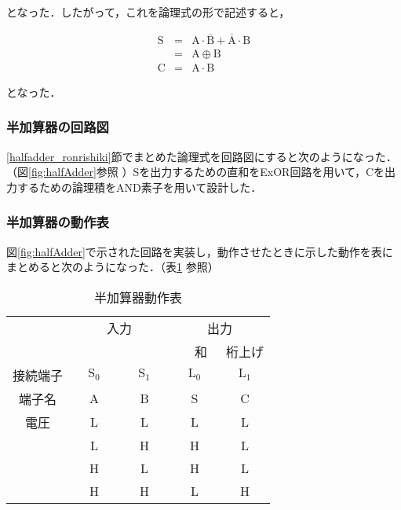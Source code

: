 となった．したがって，これを論理式の形で記述すると，

\begin{eqnarray}
	\mathrm{S} &=& \mathrm{A} \cdot \overline{\mathrm{B}} + \overline{\mathrm{A}} \cdot \mathrm{B} \nonumber \\
	&=& \mathrm{A} \oplus \mathrm{B} \nonumber \\
	\mathrm{C} &=& \mathrm{A} \cdot \mathrm{B} \nonumber 
\end{eqnarray}

となった．

%
%
\subsubsection{半加算器の回路図}
\label{halfadder_kairozu}
\ref{halfadder_ronrishiki}節でまとめた論理式を回路図にすると次のようになった．（図\ref{fig:halfAdder}参照 ）Sを出力するための直和をExOR回路を用いて，Cを出力するための論理積をAND素子を用いて設計した．

%
%
\subsubsection{半加算器の動作表}
\label{halfadder_dousahyou}
図\ref{fig:halfAdder}で示された回路を実装し，動作させたときに示した動作を表にまとめると次のようになった．（表\ref{tab:halfadder_dousahyoutab} 参照）

\begin {table}[ht]
	\begin {center}
		\caption {半加算器動作表}%
		\begin {tabular}{c|cc|cc}\hline
			\multicolumn{1}{c|}{}&%
			\multicolumn{2}{c}{入力}&%
			\multicolumn{2}{|c}{出力}\\ %
			\multicolumn{1}{c|}{}&
			\multicolumn{1}{c}{　　　}&
			\multicolumn{1}{c}{　　　}&%
			\multicolumn{1}{|c}{　和　}&%
			\multicolumn{1}{c}{桁上げ}\\ %
			\hline
			\multicolumn{1}{c|}{接続端子}&%
			\multicolumn{1}{c}{$\mathrm{S_0}$}&%
			\multicolumn{1}{c}{$\mathrm{S_1}$}&%
			\multicolumn{1}{|c}{$\mathrm{L_0}$}&%
			\multicolumn{1}{c}{$\mathrm{L_1}$}\\%
			\multicolumn{1}{c|}{端子名}&%
			\multicolumn{1}{c}{A}&%
			\multicolumn{1}{c}{B}&%
			\multicolumn{1}{|c}{S}&%
			\multicolumn{1}{c}{C}\\%
			\hline
			電圧&L&L&L&L\\%
			&L&H&H&L\\%
			&H&L&H&L\\%
			&H&H&L&H\\
			\hline
		\end{tabular}
		\label {tab:halfadder_dousahyoutab}%
	\end{center}
\end{table}

